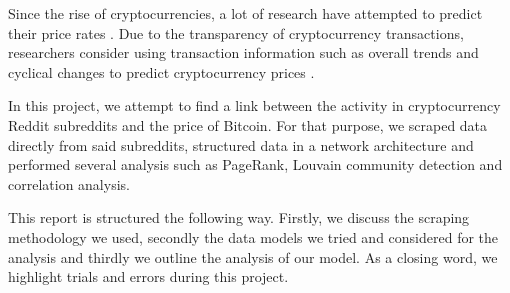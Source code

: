 Since the rise of cryptocurrencies, a lot of research have attempted to predict their price rates \cite{kooPredictionBitcoinPrice2021,coccoPredictionsBitcoinPrices2021,liMultiwindowBitcoinPrice2021}. Due to the transparency of cryptocurrency transactions, researchers consider using transaction information such as overall trends and cyclical changes to predict cryptocurrency prices \cite{liCrossCryptocurrencyRelationship2022}.

In this project, we attempt to find a link between the activity in cryptocurrency Reddit subreddits and the price of Bitcoin. For that purpose, we scraped data directly from said subreddits, structured data in a network architecture and performed several analysis such as PageRank, Louvain community detection and correlation analysis.

This report is structured the following way. Firstly, we discuss the scraping methodology we used, secondly the data models we tried and considered for the analysis and thirdly we outline the analysis of our model. As a closing word, we highlight trials and errors during this project.
